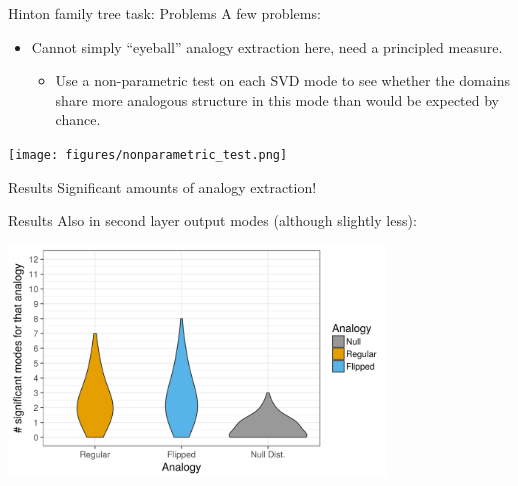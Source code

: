 \documentclass{beamer}
\begin{document}
\begin{frame}{Hinton family tree task: Problems}
A few problems:
\begin{itemize}
    \item<1-> Cannot simply ``eyeball'' analogy extraction here, need a principled measure.
    \begin{itemize}
	\item<2-> Use a non-parametric test on each SVD mode to see whether the domains share more analogous structure in this mode than would be expected by chance. 
    \end{itemize}
\end{itemize}
 {
    \texttt{[image: figures/nonparametric\_test.png]}

}
\end{frame}

\begin{frame}{Results}
Significant amounts of analogy extraction!\\[11pt]
\end{frame}
\begin{frame}{Results}
Also in second layer output modes (although slightly less):
\begin{center}
\includegraphics[width=0.75\textwidth]{../hinton_family_tree/results/output_mode_projections_violin.png} 
\end{center}
\end{frame}
\end{document}
